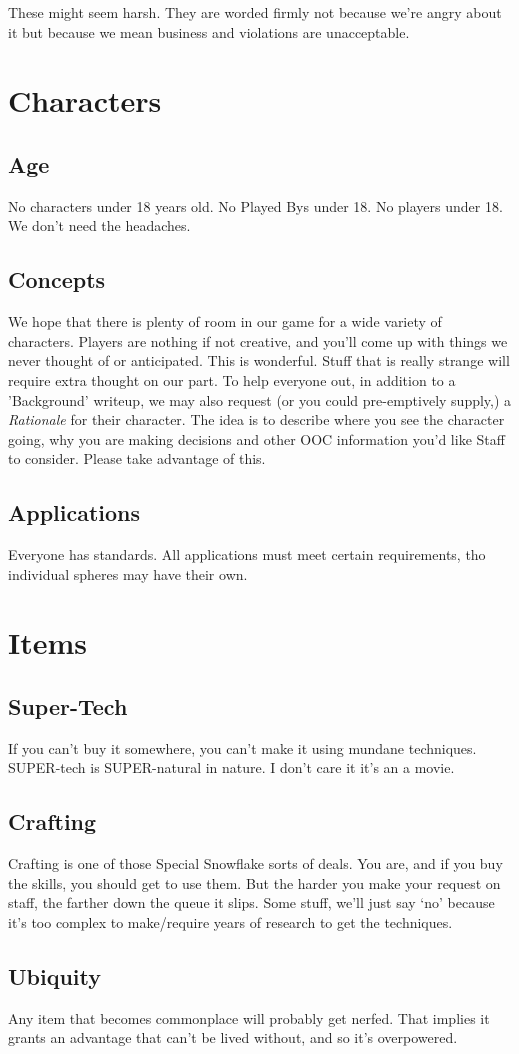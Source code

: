 These might seem harsh. 
They are worded firmly not because we're angry about it but because we mean business and violations are unacceptable.
\section{Characters}
\subsection{Age}
No characters under 18 years old.
No Played Bys under 18.
No players under 18.
We don't need the headaches.
\subsection{Concepts}
We hope that there is plenty of room in our game for a wide variety of characters.
Players are nothing if not creative, and you'll come up with things we never thought of or anticipated.
This is wonderful.
Stuff that is really strange will require extra thought on our part.
To help everyone out, in addition to a 'Background' writeup, we may also request (or you could pre-emptively supply,) a {\em Rationale} for their character.
The idea is to describe where you see the character going, why you are making decisions and other OOC information you'd like Staff to consider.
Please take advantage of this.
\subsection{Applications}
Everyone has standards.
All applications must meet certain requirements, tho individual spheres may have their own.
\section{Items}
\subsection{Super-Tech}
If you can't buy it somewhere, you can't make it using mundane techniques.
SUPER-tech is SUPER-natural in nature.
I don't care it it's an a movie.

\subsection{Crafting}
Crafting is one of those Special Snowflake sorts of deals. You are, and if
you buy the skills, you should get to use them. But the harder you make
your request on staff, the farther down the queue it slips. Some stuff,
we'll just say `no' because it's too complex to make/require
years of research to get the techniques.
\subsection{Ubiquity}
Any item that becomes commonplace will probably get nerfed. That implies
it grants an advantage that can't  be lived without, and so it's
overpowered.
